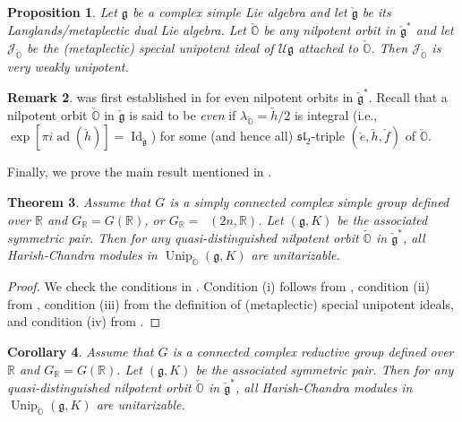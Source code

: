 \documentclass[11pt, a4paper]{amsart}
\newcommand{\J}{\mathcal{J}}
\newcommand{\g}{\mathfrak{g}}
\newcommand{\orb}{\mathbb{O}}
\newcommand{\fg}{\mathfrak{g}}
\newcommand{\ckfg}{{\check{\fg}}}
\newcommand{\ckorb}{\check{\orb}}
\newcommand{\cU}{\mathcal{U}}
\newcommand{\Ug}{\cU\fg}
\DeclareMathOperator{\ad}{ad}
\DeclareMathOperator{\Unip}{Unip}
\DeclareMathOperator{\Mp}{\widetilde{Sp}}
\newcommand{\UnipOv}{\Unip_{\ckorb}}
\newcommand{\Id}{\operatorname{Id}}
\newcommand{\R}{\mathbb{R}}
\newcommand{\GR}{G_\R}
\newcommand{\slf}{\mathfrak{sl}}
\newtheorem{Thm}{Theorem}[subsection]
\newtheorem{Prop}[Thm]{Proposition}
\newtheorem{Cor}[Thm]{Corollary}
\theoremstyle{definition}
\newtheorem{Rem}[Thm]{Remark}
\numberwithin{equation}{section}
\begin{document}
\begin{Prop} \label{prop:special_weakly_unipotent}
	Let $\fg$ be a complex simple Lie algebra and let $\ckfg$ be its Langlands/metaplectic dual Lie algebra.
	Let $\ckorb$ be any nilpotent orbit in $\ckfg^*$ and let $\J_{\ckorb}$ be the (metaplectic) special unipotent ideal of $\Ug$ attached to $\ckorb$. Then $\J_{\ckorb}$ is very weakly unipotent.
\end{Prop}
\begin{Rem}
	 was first established in \cite[Proposition 5.10]{BV85:unipotent} for even nilpotent orbits in $\ckfg^*$. Recall that a nilpotent orbit $\ckorb$ in $\ckfg$ is said to be \emph{even} if $\lambda_{\ckorb} = \check{h}/2$ is integral (i.e., $\exp[\pi i \ad(\check{h})] = \Id_{\ckfg}$) for some (and hence all) $\slf_2$-triple $(\check{e},\check{h}, \check{f})$ of $\ckorb$.  
\end{Rem}

Finally, we prove the main result  mentioned in .

\begin{Thm} \label{thm:unitarity_dist}
	Assume that $G$ is a simply connected complex simple group defined over $\R$ and $\GR=G(\R)$, or $\GR = \Mp(2n, \R)$. Let $(\g,K)$ be the associated symmetric pair. Then for any quasi-distinguished nilpotent orbit $\ckorb$ in $\ckfg^*$, all Harish-Chandra modules in $\UnipOv(\fg,K)$ are unitarizable.
\end{Thm}

\begin{proof}
	We check the conditions in . Condition (i) follows from , condition (ii) from , condition (iii) from the definition of (metaplectic) special unipotent ideals, and condition (iv) from .
\end{proof}

\begin{Cor}\label{cor:unitarity_dist_reductive}
	Assume that $G$ is a connected complex reductive group defined over $\R$ and $\GR=G(\R)$. Let $(\g,K)$ be the associated symmetric pair. Then for any quasi-distinguished nilpotent orbit $\ckorb$ in $\ckfg^*$, all Harish-Chandra modules in $\UnipOv(\fg,K)$ are unitarizable.
\end{Cor}
\end{document}
